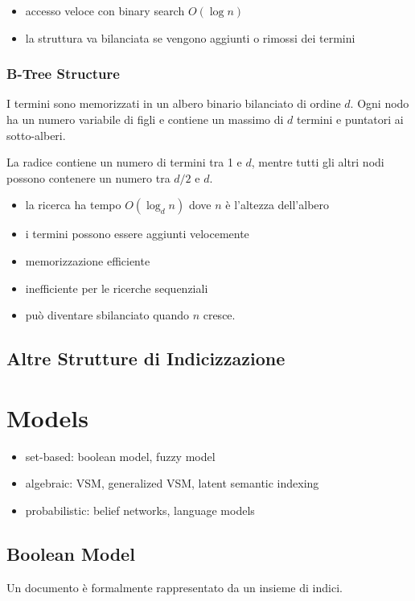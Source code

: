 \begin{itemize}
  \item accesso veloce con binary search $O(\log n)$
  \item la struttura va bilanciata se vengono aggiunti o rimossi dei termini
\end{itemize}

\subsubsection*{B-Tree Structure}
I termini sono memorizzati in un albero binario bilanciato di ordine $d$.
Ogni nodo ha un numero variabile di figli e contiene un massimo di $d$ termini e puntatori ai sotto-alberi.

La radice contiene un numero di termini tra 1 e $d$, mentre tutti gli altri nodi possono contenere un numero tra $d/2$ e $d$.

\begin{itemize}
  \item la ricerca ha tempo $O(\log_d n)$ dove $n$ è l'altezza dell'albero
  \item i termini possono essere aggiunti velocemente
  \item memorizzazione efficiente
  \item inefficiente per le ricerche sequenziali
  \item può diventare sbilanciato quando $n$ cresce.
\end{itemize}

\subsection{Altre Strutture di Indicizzazione}

\section{Models}

\begin{itemize}
  \item set-based: boolean model, fuzzy model
  \item algebraic: VSM, generalized VSM, latent semantic indexing
  \item probabilistic: belief networks, language models
\end{itemize}

\subsection{Boolean Model}
Un documento è formalmente rappresentato da un insieme di indici.

